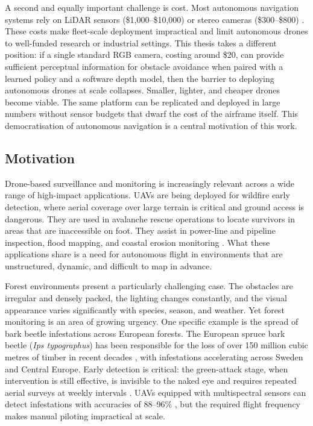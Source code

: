 \documentclass[../main.tex]{subfiles}
\begin{document}
A second and equally important challenge is cost. Most autonomous navigation systems rely on LiDAR sensors (\$1,000--\$10,000) or stereo cameras (\$300--\$800) \cite{Butt2024,Hrabar2012}. These costs make fleet-scale deployment impractical and limit autonomous drones to well-funded research or industrial settings. This thesis takes a different position: if a single standard RGB camera, costing around \$20, can provide sufficient perceptual information for obstacle avoidance when paired with a learned policy and a software depth model, then the barrier to deploying autonomous drones at scale collapses. Smaller, lighter, and cheaper drones become viable. The same platform can be replicated and deployed in large numbers without sensor budgets that dwarf the cost of the airframe itself. This democratisation of autonomous navigation is a central motivation of this work.

\subsection{Motivation}

Drone-based surveillance and monitoring is increasingly relevant across a wide range of high-impact applications. UAVs are being deployed for wildfire early detection, where aerial coverage over large terrain is critical and ground access is dangerous. They are used in avalanche rescue operations to locate survivors in areas that are inaccessible on foot. They assist in power-line and pipeline inspection, flood mapping, and coastal erosion monitoring \cite{Butt2024,Fu2024}. What these applications share is a need for autonomous flight in environments that are unstructured, dynamic, and difficult to map in advance.

Forest environments present a particularly challenging case. The obstacles are irregular and densely packed, the lighting changes constantly, and the visual appearance varies significantly with species, season, and weather. Yet forest monitoring is an area of growing urgency. One specific example is the spread of bark beetle infestations across European forests. The European spruce bark beetle (\textit{Ips typographus}) has been responsible for the loss of over 150 million cubic metres of timber in recent decades \cite{Klousek2019,Bozzini2024}, with infestations accelerating across Sweden and Central Europe. Early detection is critical: the green-attack stage, when intervention is still effective, is invisible to the naked eye and requires repeated aerial surveys at weekly intervals \cite{Bozzini2024,Bijou2025}. UAVs equipped with multispectral sensors can detect infestations with accuracies of 88--96\% \cite{Klousek2019,Turkulainen2023,Bozzini2024}, but the required flight frequency makes manual piloting impractical at scale.
\end{document}
